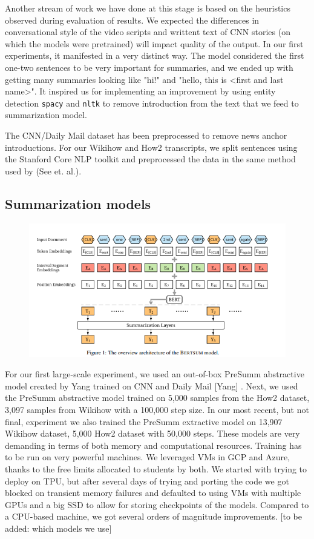 \documentclass{article}
\begin{document}
Another stream of work we have done at this stage is based on the heuristics observed during evaluation of results. We expected the differences in conversational style of the video scripts and writtent text of CNN stories (on which the models were pretrained) will impact quality of the output. In our first experiments, it manifested in a very distinct way. The model considered the first one-two sentences to be very important for summaries, and we ended up with getting many summaries looking like "hi!" and "hello, this is <first and last name>". It inspired us for implementing an improvement by using entity detection   \verb+spacy+ and \verb+nltk+ to remove introduction from the text that we feed to summarization model.  

The CNN/Daily Mail dataset has been preprocessed to remove news anchor introductions. For our Wikihow and How2 transcripts, we  split sentences using the Stanford Core NLP toolkit and preprocessed the data in the same method used by (See et. al.).  


\subsection{Summarization models}

\begin{figure}
  \includegraphics[width=\linewidth]{bertsumarchitecture.png}
  \label{fig:funnysummary}
\end{figure}

For our first large-scale experiment, we used an out-of-box PreSumm abstractive model  created by Yang trained on CNN and Daily Mail [Yang] .  Next, we used the PreSumm abstractive model  trained on 5,000 samples from the How2 dataset, 3,097 samples from Wikihow with a 100,000 step size. In our most recent, but not final,  experiment we also trained the PreSumm extractive model on 13,907 Wikihow dataset, 5,000 How2 dataset with 50,000 steps.
These models are very demanding in terms of both memory and computational resources. Training has to be run on very powerful machines. We leveraged VMs in GCP and Azure, thanks to the free limits allocated to students by both. We started with trying to deploy on TPU, but after several days of trying and porting the code we got blocked on transient memory failures and defaulted to using VMs with multiple GPUs and a big SSD to allow for storing checkpoints of the models. Compared to a CPU-based machine, we got several orders of magnitude improvements. [to be added: which models we use]
\end{document}
